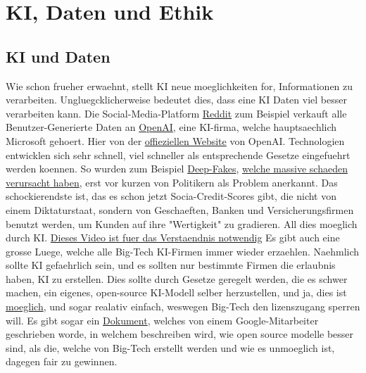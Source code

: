 \documentclass{report}
\begin{document}
\chapter{KI, Daten und Ethik}
\section{KI und Daten}
Wie schon frueher erwaehnt, stellt KI neue moeglichkeiten for, Informationen zu verarbeiten. Ungluegcklicherweise bedeutet dies, dass eine KI Daten viel besser verarbeiten kann.
Die Social-Media-Platform \hyperlink{reddit.com}{Reddit} zum Beispiel verkauft alle Benutzer-Generierte Daten an \hyperlink{https://openai.com/}{OpenAI}, eine KI-firma, welche hauptsaechlich Microsoft gehoert.
Hier von der \hyperlink{https://openai.com/index/openai-and-reddit-partnership/}{offieziellen Website} von OpenAI. 
\newline
\newline
Technologien entwicklen sich sehr schnell, viel schneller als entsprechende Gesetze eingefuehrt werden koennen. So wurden zum Beispiel \hyperlink{https://en.wikipedia.org/wiki/Deepfake}{Deep-Fakes}, \hyperlink{https://edition.cnn.com/2024/05/16/tech/arup-deepfake-scam-loss-hong-kong-intl-hnk/index.html}{welche massive schaeden verursacht haben}, erst vor kurzen von Politikern als Problem anerkannt.
\newline
\newline
Das schockierendste ist, das es schon jetzt Socia-Credit-Scores gibt, die nicht von einem Diktaturstaat, sondern von Geschaeften, Banken und Versicherungsfirmen benutzt werden, um Kunden auf ihre "Wertigkeit" zu gradieren. All dies moeglich durch KI.
\hyperlink{https://youtube.com/watch?v=VUhKTngpd8c}{Dieses Video ist fuer das Verstaendnis notwendig}
\newline
\newline
Es gibt auch eine grosse Luege, welche alle Big-Tech KI-Firmen immer wieder erzaehlen. Naehmlich sollte KI gefaehrlich sein, und es sollten nur bestimmte Firmen die erlaubnis haben, KI zu erstellen. Dies sollte durch Gesetze geregelt werden, die es schwer machen, ein eigenes, open-source KI-Modell selber herzustellen, und ja, dies ist \hyperlink{https://youtube.com/watch?v=188fipF-i5I}{moeglich}, und sogar realativ einfach, weswegen Big-Tech den lizenszugang sperren will.
\newline
Es gibt sogar ein \hyperlink{https://www.theguardian.com/technology/2023/may/05/google-engineer-open-source-technology-ai-openai-chatgpt}{Dokument}, welches von einem Google-Mitarbeiter geschrieben worde, in welchem beschreiben wird, wie open source modelle besser sind, als die, welche von Big-Tech erstellt werden und wie es unmoeglich ist, dagegen fair zu gewinnen.
\end{document}
